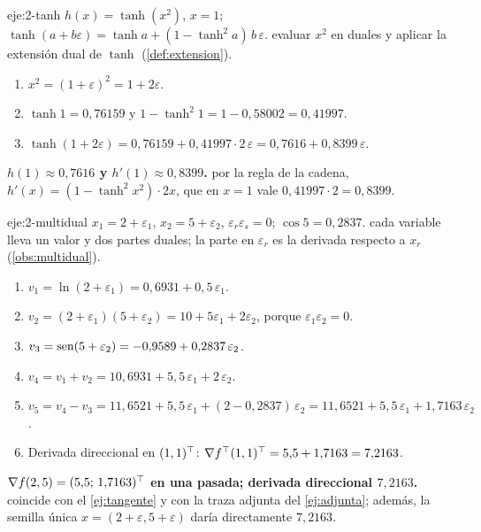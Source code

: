\begin{solucion}{eje:2-tanh}
\datos $h(x)=\tanh(x^{2})$, $x=1$; $\tanh(a+b\varepsilon)=\tanh a+(1-\tanh^{2}a)\,b\,\varepsilon$.
\planteamiento evaluar $x^{2}$ en duales y aplicar la extensión dual de $\tanh$ (\cref{def:extension}).
\pasos
\begin{enumerate}[label=\arabic*.]
  \item $x^{2}=(1+\varepsilon)^{2}=1+2\varepsilon$.
  \item $\tanh 1=0{,}76159$ y $1-\tanh^{2}1=1-0{,}58002=0{,}41997$.
  \item $\tanh(1+2\varepsilon)=0{,}76159+0{,}41997\cdot 2\,\varepsilon=0{,}7616+0{,}8399\,\varepsilon$.
\end{enumerate}
\resultado \textbf{$h(1)\approx 0{,}7616$ y $h'(1)\approx 0{,}8399$.}
\comprobacion por la regla de la cadena, $h'(x)=(1-\tanh^{2}x^{2})\cdot 2x$, que en $x=1$ vale $0{,}41997\cdot 2=0{,}8399$.
\end{solucion}

\begin{solucion}{eje:2-multidual}
\datos $x_1=2+\varepsilon_1$, $x_2=5+\varepsilon_2$, $\varepsilon_r\varepsilon_s=0$; $\cos 5=0{,}2837$.
\planteamiento cada variable lleva un valor y dos partes duales; la parte en $\varepsilon_r$ es la derivada respecto a $x_r$ (\cref{obs:multidual}).
\pasos
\begin{enumerate}[label=\arabic*.]
  \item $v_1=\ln(2+\varepsilon_1)=0{,}6931+0{,}5\,\varepsilon_1$.
  \item $v_2=(2+\varepsilon_1)(5+\varepsilon_2)=10+5\varepsilon_1+2\varepsilon_2$, porque $\varepsilon_1\varepsilon_2=0$.
  \item $v_3=\operatorname{sen}(5+\varepsilon_2)=-0{,}9589+0{,}2837\,\varepsilon_2$.
  \item $v_4=v_1+v_2=10{,}6931+5{,}5\,\varepsilon_1+2\,\varepsilon_2$.
  \item $v_5=v_4-v_3=11{,}6521+5{,}5\,\varepsilon_1+(2-0{,}2837)\,\varepsilon_2=11{,}6521+5{,}5\,\varepsilon_1+1{,}7163\,\varepsilon_2$.
  \item Derivada direccional en $(1,1)^{\top}$: $\nabla f^{\top}(1,1)^{\top}=5{,}5+1{,}7163=7{,}2163$.
\end{enumerate}
\resultado \textbf{$\nabla f(2,5)=(5{,}5;\,1{,}7163)^{\top}$ en una pasada; derivada direccional $7{,}2163$.}
\comprobacion coincide con el \cref{ej:tangente} y con la traza adjunta del \cref{ej:adjunta}; además, la semilla única $x=(2+\varepsilon,5+\varepsilon)$ daría directamente $7{,}2163$.
\end{solucion}

